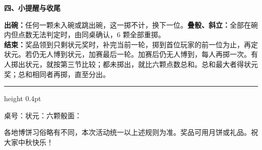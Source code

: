 \documentclass[11pt,a4paper,fontset=none]{ctexart}
\newcommand{\shead}[2]{\par\vspace{7pt}%
  {\fontsize{12.5}{17}\selectfont\bfseries\sffamily
  #1、#2\hspace{10pt}{\color{rulegray}\leaders\hrule height 0.3pt\hfill}\kern0pt\par}\vspace{4pt}}
\begin{document}
\shead{四}{小提醒与收尾}
\textbf{出碗：}任何一颗未入碗或跳出碗，这一掷不计，换下一位。\textbf{叠骰、斜立：}全部在碗内但点数无法判定时，由同桌确认，6 颗全部重掷。\\
\textbf{结束：}奖品领到只剩状元奖时，补完当前一轮，掷到首位玩家的前一位为止，再定状元。若仍无人博到状元，加赛最后一轮。加赛后仍无人博到，每人再掷一次。有人掷出状元，就按第三节比较；都未掷出，就比六颗点数总和。总和最大者得状元奖；总和相同者再掷，直至分出。

\vspace{7pt}\hrule height 0.4pt\vspace{5pt}
{\fontsize{10}{15}\selectfont
桌号：\underline{\hspace{1.2cm}}\quad 状元：\underline{\hspace{2.4cm}}\quad 六颗骰面：\underline{\hspace{3.4cm}}\par}
\vspace{3pt}
{\fontsize{9}{12}\selectfont 各地博饼习俗略有不同，本次活动统一以上述规则为准。奖品可用月饼或礼品。祝大家中秋快乐！\par}
\end{document}
